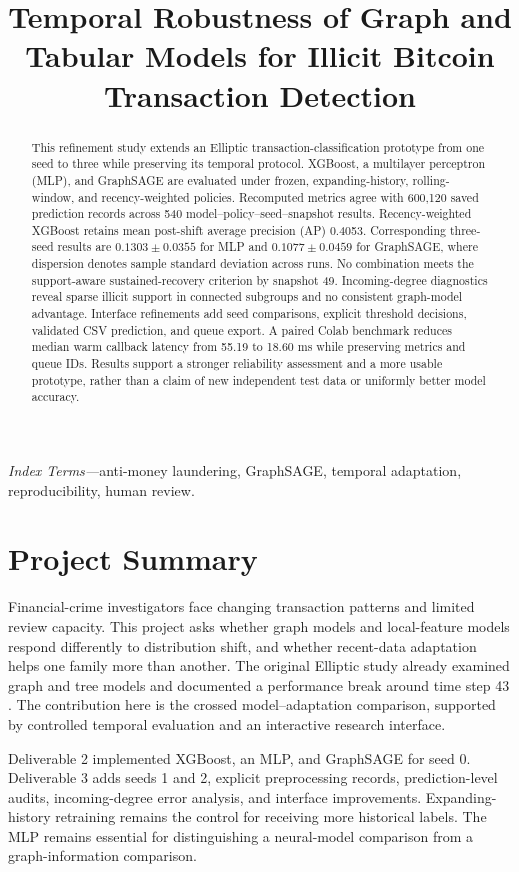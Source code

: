 \documentclass[conference]{IEEEtran}
\title{Temporal Robustness of Graph and Tabular Models for Illicit Bitcoin Transaction Detection}
\author{\IEEEauthorblockN{Alex (GitHub: alexchooys)}
\IEEEauthorblockA{Applied Data Science, University of Florida\\\url{https://github.com/alexchooys}}}
\begin{document}
\maketitle
\begin{abstract}
This refinement study extends an Elliptic transaction-classification prototype from one seed to three while preserving its temporal protocol. XGBoost, a multilayer perceptron (MLP), and GraphSAGE are evaluated under frozen, expanding-history, rolling-window, and recency-weighted policies. Recomputed metrics agree with 600,120 saved prediction records across 540 model--policy--seed--snapshot results. Recency-weighted XGBoost retains mean post-shift average precision (AP) 0.4053. Corresponding three-seed results are $0.1303\pm0.0355$ for MLP and $0.1077\pm0.0459$ for GraphSAGE, where dispersion denotes sample standard deviation across runs. No combination meets the support-aware sustained-recovery criterion by snapshot 49. Incoming-degree diagnostics reveal sparse illicit support in connected subgroups and no consistent graph-model advantage. Interface refinements add seed comparisons, explicit threshold decisions, validated CSV prediction, and queue export. A paired Colab benchmark reduces median warm callback latency from 55.19 to 18.60 ms while preserving metrics and queue IDs. Results support a stronger reliability assessment and a more usable prototype, rather than a claim of new independent test data or uniformly better model accuracy.
\end{abstract}
\noindent\textit{Index Terms---}anti-money laundering, GraphSAGE, temporal adaptation, reproducibility, human review.

\section{Project Summary}
Financial-crime investigators face changing transaction patterns and limited review capacity. This project asks whether graph models and local-feature models respond differently to distribution shift, and whether recent-data adaptation helps one family more than another. The original Elliptic study already examined graph and tree models and documented a performance break around time step 43 \cite{elliptic}. The contribution here is the crossed model--adaptation comparison, supported by controlled temporal evaluation and an interactive research interface.

Deliverable 2 implemented XGBoost, an MLP, and GraphSAGE for seed 0. Deliverable 3 adds seeds 1 and 2, explicit preprocessing records, prediction-level audits, incoming-degree error analysis, and interface improvements. Expanding-history retraining remains the control for receiving more historical labels. The MLP remains essential for distinguishing a neural-model comparison from a graph-information comparison.
\end{document}
